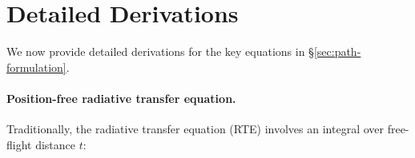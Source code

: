 \section{Detailed Derivations}
\label{sec:derivation}

We now provide detailed derivations for the key equations in \S\ref{sec:path-formulation}.

\paragraph{Position-free radiative transfer equation.}
Traditionally, the radiative transfer equation (RTE) involves an integral over free-flight distance $t$:

%
%
%
